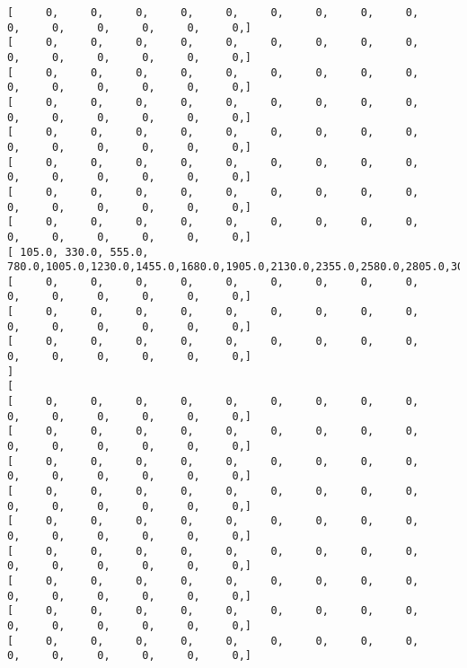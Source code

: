\documentclass[11pt]{article}
\begin{document}
\begin{Verbatim}[commandchars=\\\{\}]
[      0,      0,      0,      0,      0,      0,      0,      0,      0,      0,      0,      0,      0,      0,      0, ]
[      0,      0,      0,      0,      0,      0,      0,      0,      0,      0,      0,      0,      0,      0,      0, ]
[      0,      0,      0,      0,      0,      0,      0,      0,      0,      0,      0,      0,      0,      0,      0, ]
[      0,      0,      0,      0,      0,      0,      0,      0,      0,      0,      0,      0,      0,      0,      0, ]
[      0,      0,      0,      0,      0,      0,      0,      0,      0,      0,      0,      0,      0,      0,      0, ]
[      0,      0,      0,      0,      0,      0,      0,      0,      0,      0,      0,      0,      0,      0,      0, ]
[      0,      0,      0,      0,      0,      0,      0,      0,      0,      0,      0,      0,      0,      0,      0, ]
[      0,      0,      0,      0,      0,      0,      0,      0,      0,      0,      0,      0,      0,      0,      0, ]
[  105.0,  330.0,  555.0,  780.0, 1005.0, 1230.0, 1455.0, 1680.0, 1905.0, 2130.0, 2355.0, 2580.0, 2805.0, 3030.0, 3255.0, ]
[      0,      0,      0,      0,      0,      0,      0,      0,      0,      0,      0,      0,      0,      0,      0, ]
[      0,      0,      0,      0,      0,      0,      0,      0,      0,      0,      0,      0,      0,      0,      0, ]
[      0,      0,      0,      0,      0,      0,      0,      0,      0,      0,      0,      0,      0,      0,      0, ]
]
[
[      0,      0,      0,      0,      0,      0,      0,      0,      0,      0,      0,      0,      0,      0,      0, ]
[      0,      0,      0,      0,      0,      0,      0,      0,      0,      0,      0,      0,      0,      0,      0, ]
[      0,      0,      0,      0,      0,      0,      0,      0,      0,      0,      0,      0,      0,      0,      0, ]
[      0,      0,      0,      0,      0,      0,      0,      0,      0,      0,      0,      0,      0,      0,      0, ]
[      0,      0,      0,      0,      0,      0,      0,      0,      0,      0,      0,      0,      0,      0,      0, ]
[      0,      0,      0,      0,      0,      0,      0,      0,      0,      0,      0,      0,      0,      0,      0, ]
[      0,      0,      0,      0,      0,      0,      0,      0,      0,      0,      0,      0,      0,      0,      0, ]
[      0,      0,      0,      0,      0,      0,      0,      0,      0,      0,      0,      0,      0,      0,      0, ]
[      0,      0,      0,      0,      0,      0,      0,      0,      0,      0,      0,      0,      0,      0,      0, ]

\end{Verbatim}
\end{document}

